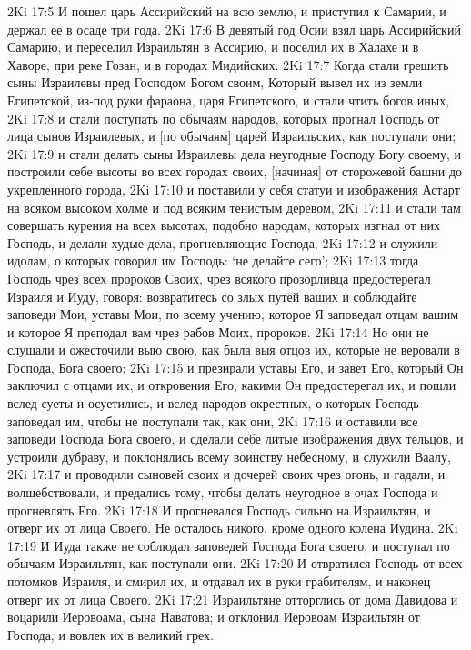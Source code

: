 2Ki 17:5  И пошел царь Ассирийский на всю землю, и приступил к Самарии, и держал ее в осаде три года.
2Ki 17:6  В девятый год Осии взял царь Ассирийский Самарию, и переселил Израильтян в Ассирию, и поселил их в Халахе и в Хаворе, при реке Гозан, и в городах Мидийских.
2Ki 17:7  Когда стали грешить сыны Израилевы пред Господом Богом своим, Который вывел их из земли Египетской, из-под руки фараона, царя Египетского, и стали чтить богов иных,
2Ki 17:8  и стали поступать по обычаям народов, которых прогнал Господь от лица сынов Израилевых, и [по обычаям] царей Израильских, как поступали они;
2Ki 17:9  и стали делать сыны Израилевы дела неугодные Господу Богу своему, и построили себе высоты во всех городах своих, [начиная] от сторожевой башни до укрепленного города,
2Ki 17:10  и поставили у себя статуи и изображения Астарт на всяком высоком холме и под всяким тенистым деревом,
2Ki 17:11  и стали там совершать курения на всех высотах, подобно народам, которых изгнал от них Господь, и делали худые дела, прогневляющие Господа,
2Ki 17:12  и служили идолам, о которых говорил им Господь: `не делайте сего';
2Ki 17:13  тогда Господь чрез всех пророков Своих, чрез всякого прозорливца предостерегал Израиля и Иуду, говоря: возвратитесь со злых путей ваших и соблюдайте заповеди Мои, уставы Мои, по всему учению, которое Я заповедал отцам вашим и которое Я преподал вам чрез рабов Моих, пророков.
2Ki 17:14  Но они не слушали и ожесточили выю свою, как была выя отцов их, которые не веровали в Господа, Бога своего;
2Ki 17:15  и презирали уставы Его, и завет Его, который Он заключил с отцами их, и откровения Его, какими Он предостерегал их, и пошли вслед суеты и осуетились, и вслед народов окрестных, о которых Господь заповедал им, чтобы не поступали так, как они,
2Ki 17:16  и оставили все заповеди Господа Бога своего, и сделали себе литые изображения двух тельцов, и устроили дубраву, и поклонялись всему воинству небесному, и служили Ваалу,
2Ki 17:17  и проводили сыновей своих и дочерей своих чрез огонь, и гадали, и волшебствовали, и предались тому, чтобы делать неугодное в очах Господа и прогневлять Его.
2Ki 17:18  И прогневался Господь сильно на Израильтян, и отверг их от лица Своего. Не осталось никого, кроме одного колена Иудина.
2Ki 17:19  И Иуда также не соблюдал заповедей Господа Бога своего, и поступал по обычаям Израильтян, как поступали они.
2Ki 17:20  И отвратился Господь от всех потомков Израиля, и смирил их, и отдавал их в руки грабителям, и наконец отверг их от лица Своего.
2Ki 17:21  Израильтяне отторглись от дома Давидова и воцарили Иеровоама, сына Наватова; и отклонил Иеровоам Израильтян от Господа, и вовлек их в великий грех.
